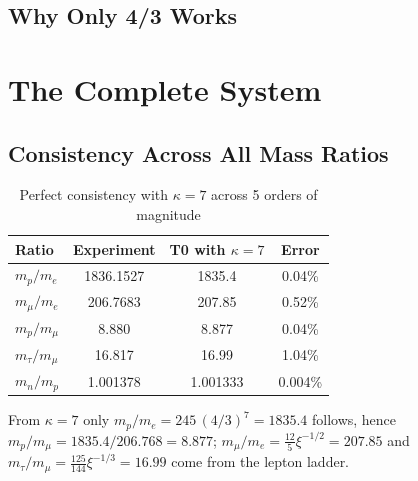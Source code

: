 	\subsection{Why Only 4/3 Works}
	
	\begin{table}[htbp]
		\centering
		\caption{Only the fourth (4/3) yields consistent results}
	\end{table}
	
	\section{The Complete System}
	
	\subsection{Consistency Across All Mass Ratios}
	
	\begin{table}[htbp]
		\centering
\begin{tabular}{lccc}
			\toprule
			\textbf{Ratio} & \textbf{Experiment} & \textbf{T0 with $\kappa=7$} & \textbf{Error} \\
			\midrule
			$m_p/m_e$ & 1836.1527 & 1835.4 & 0.04\% \\
			$m_{\mu}/m_e$ & 206.7683 & 207.85 & 0.52\% \\
			$m_p/m_{\mu}$ & 8.880 & 8.877 & 0.04\% \\
			$m_{\tau}/m_{\mu}$ & 16.817 & 16.99 & 1.04\% \\
			$m_n/m_p$ & 1.001378 & 1.001333 & 0.004\% \\
			\bottomrule
		\end{tabular}
		\caption{Perfect consistency with $\kappa = 7$ across 5 orders of magnitude}
	\end{table}
	From $\kappa = 7$ only $m_p/m_e = 245\,(4/3)^7 = 1835.4$ follows, hence $m_p/m_\mu = 1835.4/206.768 = 8.877$; $m_\mu/m_e = \tfrac{12}{5}\xi^{-1/2} = 207.85$ and $m_\tau/m_\mu = \tfrac{125}{144}\xi^{-1/3} = 16.99$ come from the lepton ladder.
	
